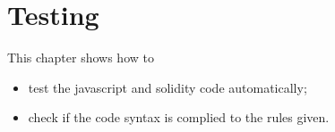 \section{Testing}
This chapter shows how to
\begin{itemize}
	\item test the javascript and solidity code automatically;
	\item check if the code syntax is complied to the rules given.
\end{itemize}

